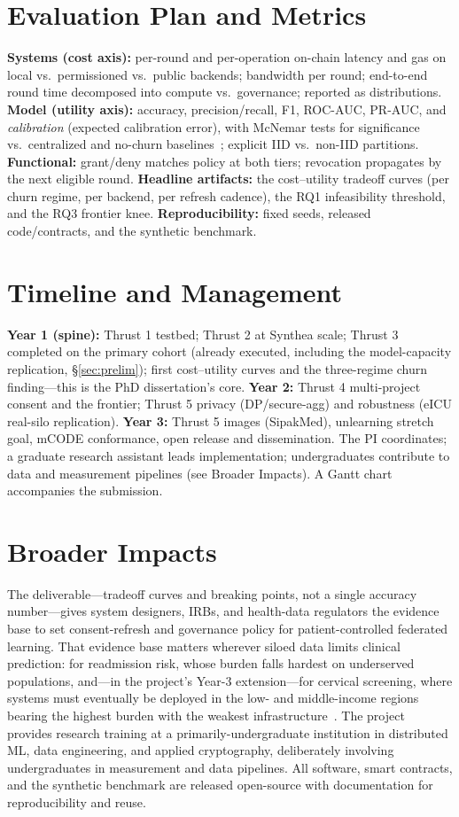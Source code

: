 \documentclass[11pt]{article}
\begin{document}
\section{Evaluation Plan and Metrics}
\textbf{Systems (cost axis):} per-round and per-operation on-chain latency and gas
on local vs.\ permissioned vs.\ public backends; bandwidth per round; end-to-end
round time decomposed into compute vs.\ governance; reported as distributions.
\textbf{Model (utility axis):} accuracy, precision/recall, F1, ROC-AUC, PR-AUC,
and
\emph{calibration} (expected calibration error), with McNemar tests for
significance vs.\ centralized and no-churn baselines~\cite{tennis}; explicit IID
vs.\ non-IID partitions. \textbf{Functional:} grant/deny matches policy at both
tiers; revocation propagates by the next eligible round. \textbf{Headline
artifacts:} the cost--utility tradeoff curves (per churn regime, per backend, per
refresh cadence), the RQ1 infeasibility threshold, and the RQ3 frontier knee.
\textbf{Reproducibility:} fixed seeds, released code/contracts, and the synthetic
benchmark.

\section{Timeline and Management}\label{sec:timeline}
\textbf{Year 1 (spine):} Thrust 1 testbed; Thrust 2 at Synthea scale; Thrust 3
completed on the primary cohort (already executed, including the
model-capacity replication, \S\ref{sec:prelim}); first cost--utility curves and
the three-regime churn finding---this is the
PhD dissertation's core. \textbf{Year 2:} Thrust 4 multi-project consent and the
frontier; Thrust 5 privacy (DP/secure-agg) and robustness (eICU real-silo
replication).
\textbf{Year 3:} Thrust 5 images (SipakMed), unlearning stretch goal, mCODE
conformance, open release and dissemination. The PI coordinates; a graduate
research assistant leads implementation; undergraduates contribute to data and
measurement pipelines (see Broader Impacts). A Gantt chart accompanies the
submission.

\section{Broader Impacts}
The deliverable---tradeoff curves and breaking points, not a single
accuracy number---gives system designers, IRBs, and health-data regulators the
evidence base to set consent-refresh and governance policy for
patient-controlled federated learning. That evidence base matters wherever
siloed data limits clinical prediction: for readmission risk, whose burden falls
hardest on underserved populations, and---in the project's Year-3
extension---for cervical screening, where systems must eventually be deployed in
the low- and middle-income regions bearing the highest burden with the weakest
infrastructure~\cite{globocan}. The
project provides research training at a primarily-undergraduate institution in
distributed ML, data engineering, and applied cryptography, deliberately involving
undergraduates in measurement and data pipelines. All software, smart contracts,
and the synthetic benchmark are released open-source with documentation for
reproducibility and reuse.
\end{document}
